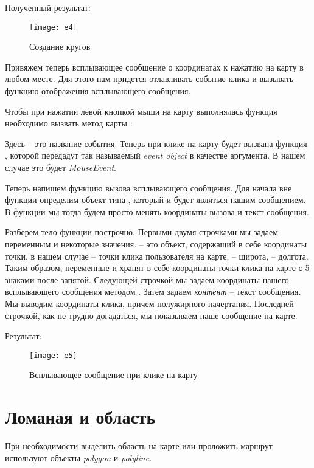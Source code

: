 Полученный результат:
\begin{figure}[ht!]
    \center
    \texttt{[image: e4]}
    \caption{Создание кругов}
    \label{pic:e4}
\end{figure}

Привяжем теперь всплывающее сообщение о координатах к нажатию на карту в 
любом месте. Для этого нам придется отлавливать событие клика и вызывать 
функцию отображения всплывающего сообщения.

Чтобы при нажатии левой кнопкой мыши на карту выполнялась функция 
 необходимо вызвать метод  карты :


Здесь  -- это название события. Теперь при клике на карту будет 
вызвана функция , которой передадут так называемый 
\emph{event object} в качестве аргумента. В нашем случае это будет 
\emph{MouseEvent}.

Теперь напишем функцию вызова всплывающего сообщения. Для начала вне функции 
определим объект типа , который и будет являться нашим 
сообщением. В функции  мы тогда будем просто менять координаты 
вызова и текст сообщения.



Разберем тело функции построчно. Первыми двумя строчками мы задаем 
переменным  и  некоторые значения.  -- это 
объект, содержащий в себе координаты точки, в нашем случае -- точки клика 
пользователя на карте;  -- широта,  -- 
долгота. Таким образом, переменные  и  хранят в себе 
координаты точки клика на карте с 5 знаками после запятой. Следующей строчкой 
мы задаем координаты нашего всплывающего сообщения методом . 
Затем задаем \emph{контент} -- текст сообщения. Мы выводим координаты клика, 
причем полужирного начертания. Последней строчкой, как не трудно догадаться, 
мы показываем наше сообщение на карте.

Результат:
\begin{figure}[ht!]
    \center
    \texttt{[image: e5]}
    \caption{Всплывающее сообщение при клике на карту}
    \label{pic:e5}
\end{figure}

\section{Ломаная и область}
При необходимости выделить область на карте или проложить маршрут используют 
объекты \emph{polygon} и \emph{polyline}.

